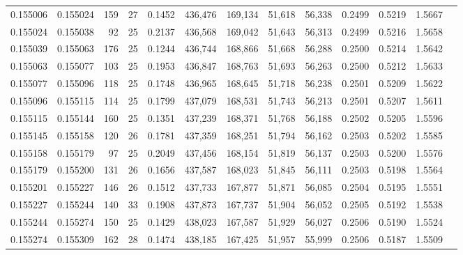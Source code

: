 \begin{tabular}{rrrrrrrrrrrrr}
0.155006 & 0.155024 & 159 &  27 &                                     0.1452 & 436,476 & 169,134 &  51,618 &  56,338 & 0.2499 & 0.5219 & 1.5667 \\
0.155024 & 0.155038 &  92 &  25 &                                     0.2137 & 436,568 & 169,042 &  51,643 &  56,313 & 0.2499 & 0.5216 & 1.5658 \\
0.155039 & 0.155063 & 176 &  25 &                                     0.1244 & 436,744 & 168,866 &  51,668 &  56,288 & 0.2500 & 0.5214 & 1.5642 \\
0.155063 & 0.155077 & 103 &  25 &                                     0.1953 & 436,847 & 168,763 &  51,693 &  56,263 & 0.2500 & 0.5212 & 1.5633 \\
0.155077 & 0.155096 & 118 &  25 &                                     0.1748 & 436,965 & 168,645 &  51,718 &  56,238 & 0.2501 & 0.5209 & 1.5622 \\
0.155096 & 0.155115 & 114 &  25 &                                     0.1799 & 437,079 & 168,531 &  51,743 &  56,213 & 0.2501 & 0.5207 & 1.5611 \\
0.155115 & 0.155144 & 160 &  25 &                                     0.1351 & 437,239 & 168,371 &  51,768 &  56,188 & 0.2502 & 0.5205 & 1.5596 \\
0.155145 & 0.155158 & 120 &  26 &                                     0.1781 & 437,359 & 168,251 &  51,794 &  56,162 & 0.2503 & 0.5202 & 1.5585 \\
0.155158 & 0.155179 &  97 &  25 &                                     0.2049 & 437,456 & 168,154 &  51,819 &  56,137 & 0.2503 & 0.5200 & 1.5576 \\
0.155179 & 0.155200 & 131 &  26 &                                     0.1656 & 437,587 & 168,023 &  51,845 &  56,111 & 0.2503 & 0.5198 & 1.5564 \\
0.155201 & 0.155227 & 146 &  26 &                                     0.1512 & 437,733 & 167,877 &  51,871 &  56,085 & 0.2504 & 0.5195 & 1.5551 \\
0.155227 & 0.155244 & 140 &  33 &                                     0.1908 & 437,873 & 167,737 &  51,904 &  56,052 & 0.2505 & 0.5192 & 1.5538 \\
0.155244 & 0.155274 & 150 &  25 &                                     0.1429 & 438,023 & 167,587 &  51,929 &  56,027 & 0.2506 & 0.5190 & 1.5524 \\
0.155274 & 0.155309 & 162 &  28 &                                     0.1474 & 438,185 & 167,425 &  51,957 &  55,999 & 0.2506 & 0.5187 & 1.5509 \\

\end{tabular}
